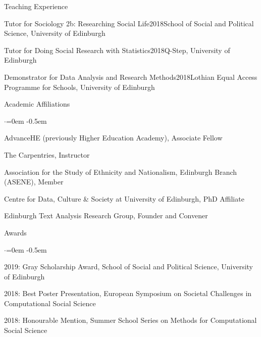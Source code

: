 \documentclass{resume} %
\begin{document}
\begin{rSection}{Teaching Experience}
\begin{rSubsectionTeaching}{Tutor for Sociology 2b: Researching Social Life}{2018}{School of Social and Political Science, University of Edinburgh}{}
\end{rSubsectionTeaching}

\begin{rSubsectionTeaching}{Tutor for Doing Social Research with Statistics}{2018}{Q-Step, University of Edinburgh}{}
\end{rSubsectionTeaching}

\begin{rSubsectionTeaching}{Demonstrator for Data Analysis and Research Methods}{2018}{Lothian Equal Access Programme for Schools, University of Edinburgh}{}
\end{rSubsectionTeaching}



\end{rSection}



\begin{rSection}{Academic Affiliations}

\begin{list}{$\cdot$}{\leftmargin=0em} %
   \itemsep -0.5em %
    \item AdvanceHE (previously Higher Education Academy), Associate Fellow
    \item The Carpentries, Instructor
    \item Association for the Study of Ethnicity and Nationalism, Edinburgh Branch (ASENE), Member
    \item Centre for Data, Culture \& Society at University of Edinburgh, PhD Affiliate
    \item Edinburgh Text Analysis Research Group, Founder and Convener
\end{list}

\end{rSection}

\begin{rSection}{Awards}
\begin{list}{$\cdot$}{\leftmargin=0em} %
   \itemsep -0.5em %
    \item 2019: Gray Scholarship Award, School of Social and Political Science, University of Edinburgh
    \item 2018: Best Poster Presentation, European Symposium on Societal Challenges in Computational Social Science
    \item 2018: Honourable Mention, Summer School Series on Methods for Computational Social Science
\end{list}
\end{rSection}
\end{document}
